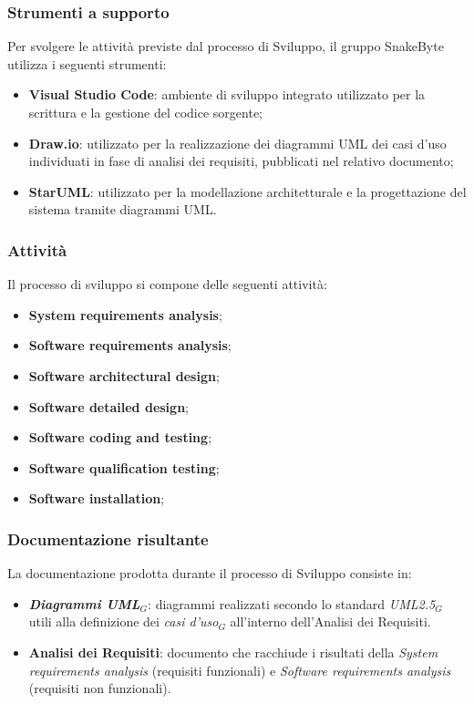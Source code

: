 \documentclass[10pt, letterpaper]{article}
\begin{document}
\subsubsection{Strumenti a supporto}
Per svolgere le attività previste dal processo di Sviluppo, il gruppo SnakeByte 
utilizza i seguenti strumenti:
\begin{itemize}
    \item \textbf{Visual Studio Code}: ambiente di sviluppo integrato utilizzato 
    per la scrittura e la gestione del codice sorgente;
    \item \textbf{Draw.io}: utilizzato per la realizzazione dei diagrammi UML 
    dei casi d'uso individuati in fase di analisi dei requisiti, pubblicati 
    nel relativo documento;
    \item \textbf{StarUML}: utilizzato per la modellazione architetturale e 
    la progettazione del sistema tramite diagrammi UML.
\end{itemize}

\subsubsection{Attività}
Il processo di sviluppo si compone delle seguenti attività:
\begin{itemize}
    \item \textbf{System requirements analysis};
    \item \textbf{Software requirements analysis};
    \item \textbf{Software architectural design};
    \item \textbf{Software detailed design};
    \item \textbf{Software coding and testing};
    \item \textbf{Software qualification testing};
    \item \textbf{Software installation};
\end{itemize}

\subsubsection{Documentazione risultante}
La documentazione prodotta durante il processo di Sviluppo consiste in:
\begin{itemize}
    \item \textbf{\textit{Diagrammi UML$_{G}$}}: diagrammi realizzati secondo lo standard \textit{UML2.5$_{G}$} utili alla definizione dei \textit{casi d'uso$_{G}$} all'interno dell'Analisi dei Requisiti.
    \item \textbf{Analisi dei Requisiti}: documento che racchiude i risultati della \textit{System requirements analysis} (requisiti funzionali) e \textit{Software requirements analysis} (requisiti non funzionali).
\end{itemize}
\end{document}

